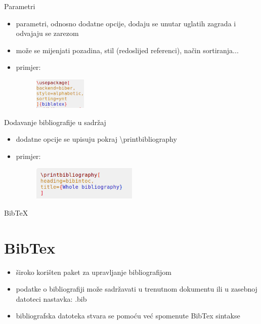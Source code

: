 \documentclass{beamer}
\begin{document}
\begin{frame}{Parametri}
\begin{itemize}
	\item parametri, odnosno dodatne opcije, dodaju se unutar uglatih zagrada i odvajaju se zarezom \\
	\item može se mijenjati pozadina, stil (redoslijed referenci), način sortiranja... \\
	\item primjer:
	\begin{figure}
		\includegraphics[width=2.5cm]{drugiprimjer.png}
	\end{figure}
\end{itemize}
\end{frame}

\begin{frame}{Dodavanje bibliografije u sadržaj}
\begin{itemize}
	\item dodatne opcije se upisuju pokraj \textbackslash printbibliography \\
	\item primjer:
	\begin{figure}
	\includegraphics[width=5cm]{treciprimjer.png}
	\end{figure}
\end{itemize}
\end{frame}

\begin{frame}{BibTeX}
\section{BibTex}
\begin{itemize}
    \item široko korišten paket za upravljanje bibliografijom \\
    \item podatke o bibliografiji može sadržavati u trenutnom 
    dokumentu ili u zasebnoj datoteci nastavka: .bib \\
    \item bibliografska datoteka stvara se pomoću već spomenute
    BibTex sintakse \\
\end{itemize}
\end{frame}
\end{document}
